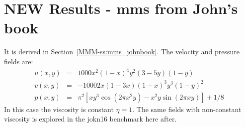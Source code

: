 \newpage
\section*{NEW Results - mms from John's book}

It is derived in Section~\ref{MMM-ss:mms_johnbook}. The velocity and pressure fields are:
\begin{eqnarray}
u(x,y) &=& 1000 x^2(1-x)^4  y^2 (3-5y) (1-y) \\
v(x,y) &=& -1000 2x(1-3x) (1-x)^3  y^3(1-y)^2   \\
p(x,y) &=& \pi^2 [xy^3 \cos(2\pi x^2 y) - x^2y \sin(2\pi xy) ]+1/8
\end{eqnarray}
In this case the viscosity is constant $\eta=1$. The same fields 
with non-constant viscosity is explored in the jokn16 benchmark here after.

